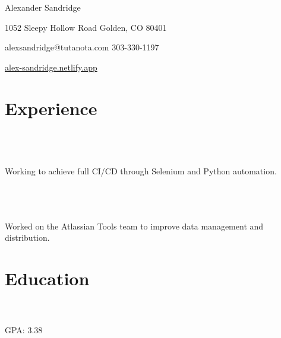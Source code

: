 \documentclass{resume}
\begin{document}
\ContactName
{Alexander Sandridge}

\bigskip

\ContactInfoPhysical
{1052 Sleepy Hollow Road}
{Golden, CO  80401}

\ContactInfoDigital
  {alexsandridge@tutanota.com}
  {303-330-1197}

{\faGlobeAmericas} \href{https://alex-sandridge.netlify.app/} {alex-sandridge.netlify.app}

\section{{\faBriefcase} Experience}
 \\
 \\
 \\
Working to achieve full CI/CD through Selenium and Python automation.

\bigskip
{} \\
 \\
 \\
Worked on the Atlassian Tools team to improve data management and distribution.

\section{{\faGraduationCap} Education}
 \\
 \\
GPA: 3.38 \\

\end{document}
